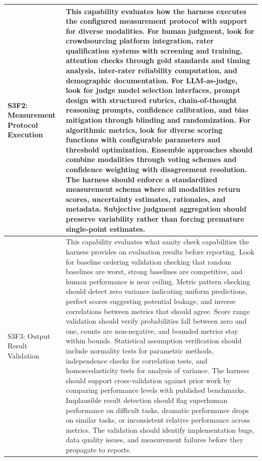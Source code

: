 \begin{longtable}{>{\raggedright\arraybackslash}p{3cm}|>{\raggedright\arraybackslash}p{16cm}}
S3F2: Measurement Protocol Execution & This capability evaluates how the harness executes the configured measurement protocol with support for diverse modalities. For human judgment, look for crowdsourcing platform integration, rater qualification systems with screening and training, attention checks through gold standards and timing analysis, inter-rater reliability computation, and demographic documentation. For LLM-as-judge, look for judge model selection interfaces, prompt design with structured rubrics, chain-of-thought reasoning prompts, confidence calibration, and bias mitigation through blinding and randomization. For algorithmic metrics, look for diverse scoring functions with configurable parameters and threshold optimization. Ensemble approaches should combine modalities through voting schemes and confidence weighting with disagreement resolution. The harness should enforce a standardized measurement schema where all modalities return scores, uncertainty estimates, rationales, and metadata. Subjective judgment aggregation should preserve variability rather than forcing premature single-point estimates. \\
\hline

S3F3: Output Result Validation & This capability evaluates what sanity check capabilities the harness provides on evaluation results before reporting. Look for baseline ordering validation checking that random baselines are worst, strong baselines are competitive, and human performance is near ceiling. Metric pattern checking should detect zero variance indicating uniform predictions, perfect scores suggesting potential leakage, and inverse correlations between metrics that should agree. Score range validation should verify probabilities fall between zero and one, counts are non-negative, and bounded metrics stay within bounds. Statistical assumption verification should include normality tests for parametric methods, independence checks for correlation tests, and homoscedasticity tests for analysis of variance. The harness should support cross-validation against prior work by comparing performance levels with published benchmarks. Implausible result detection should flag superhuman performance on difficult tasks, dramatic performance drops on similar tasks, or inconsistent relative performance across metrics. The validation should identify implementation bugs, data quality issues, and measurement failures before they propagate to reports. \\
\hline


\end{longtable}
